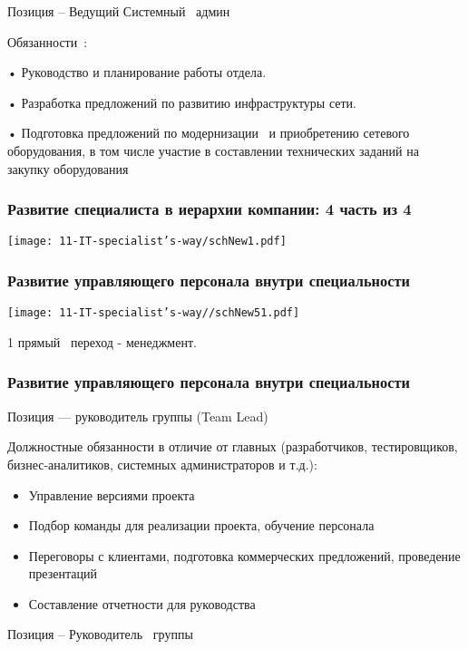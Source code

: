\documentclass{../industrial-development}
\begin{document}
\lecturenotes

Позиция – Ведущий Системный~\cite{hh} админ~\cite{itcf}

Обязанности~\cite{rab}:

•	Руководство и планирование работы отдела.

•	Разработка предложений по развитию инфраструктуры сети.

•	Подготовка предложений по модернизации ~и приобретению сетевого оборудования, в том числе участие в составлении технических заданий на закупку оборудования



\begin{frame} \frametitle{Развитие  специалиста в иерархии компании: 4 часть из 4 }
  \centerline{\texttt{[image: 11-IT-specialist's-way/schNew1.pdf]}}
\end{frame}


\begin{frame} \frametitle{Развитие управляющего персонала внутри специальности}
  \centerline{\texttt{[image: 11-IT-specialist's-way//schNew51.pdf]}}
\end{frame}
\lecturenotes

 1 прямый~\cite{mc} переход  -  менеджмент.



\begin{frame} \frametitle{Развитие управляющего персонала внутри специальности}
 \begin{block}{}
  \alert{Позиция --- руководитель группы (Team Lead)}

Должностные обязанности в отличие от главных (разработчиков, тестировщиков, бизнес-аналитиков, системных администраторов и т.д.): 
  \end{block}
  \begin{itemize}
  \item Управление версиями проекта
  \item Подбор команды для реализации проекта, обучение персонала
  \item Переговоры с клиентами, подготовка коммерческих предложений, проведение презентаций
  \item Составление отчетности для руководства
  \end{itemize}
\end{frame}

\lecturenotes

Позиция – Руководитель~\cite{hh} группы~\cite{itcf}
\end{document}
